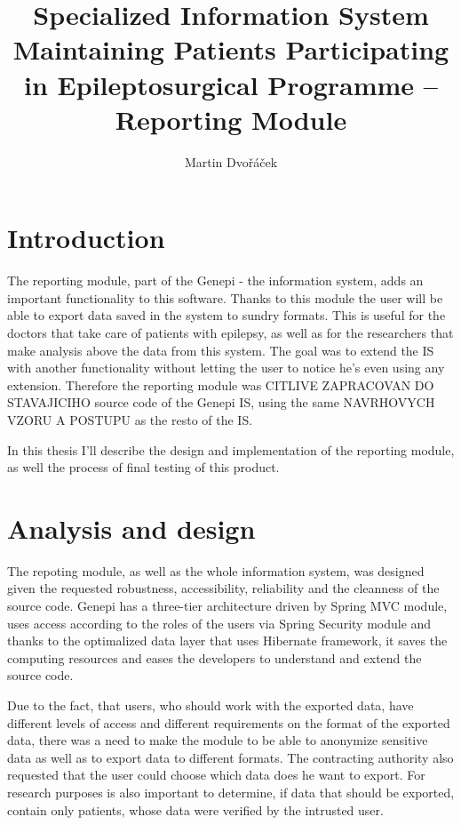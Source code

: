 \documentclass[thesis=B,english]{FITthesis}[2012/10/20]
\title{Specialized Information System Maintaining Patients Participating in Epileptosurgical Programme – Reporting Module}
\author{Martin Dvořáček} %
\begin{document}

\chapter{Introduction}
The reporting module, part of the Genepi - the information system, adds an important functionality to this software. Thanks to this module the user will be able to export data saved in the system to sundry formats. This is useful for the doctors that take care of patients with epilepsy, as well as for the researchers that make analysis above the data from this system. The goal was to extend the IS with another functionality without letting the user to notice he's even using any extension. Therefore the reporting module was CITLIVE ZAPRACOVAN DO STAVAJICIHO source code of the Genepi IS, using the same NAVRHOVYCH VZORU A POSTUPU as the resto of the IS.

In this thesis I'll describe the design and implementation of the reporting module, as well the process of final testing of this product.

\chapter{Analysis and design}
The repoting module, as well as the whole information system, was designed given the requested robustness, accessibility, reliability and the cleanness of the source code. Genepi has a three-tier architecture driven by Spring MVC module, uses access according to the roles of the users via Spring Security module and thanks to the optimalized data layer that uses Hibernate framework, it saves the computing resources and eases the developers to understand and extend the source code.

Due to the fact, that users, who should work with the exported data, have different levels of access and different requirements on the format of the exported data, there was a need to make the module to be able to anonymize sensitive data as well as to export data to different formats. The contracting authority also requested that the user could choose which data does he want to export. For research purposes is also important to determine, if data that should be exported, contain only patients, whose data were verified by the intrusted user.
\end{document}
